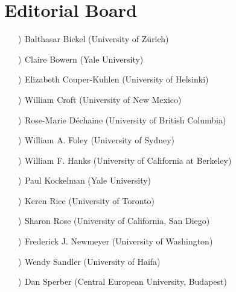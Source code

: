 \documentclass[
notumble,
nofoldmark,
]{leaflet}
\begin{document}
{    \section{Editorial Board}    
    \begin{itemize}
    \item[$\rangle$] Balthasar Bickel (University of Z\"urich)
    \item[$\rangle$] Claire Bowern (Yale University)
    \item[$\rangle$] Elizabeth Couper-Kuhlen (University of Helsinki)
    \item[$\rangle$] William Croft (University of New Mexico)
    \item[$\rangle$] Rose-Marie D\'echaine (University of British Columbia)
    \item[$\rangle$] William A. Foley (University of Sydney)
    \item[$\rangle$] William F. Hanks (University of California at Berkeley)
    \item[$\rangle$] Paul Kockelman (Yale University)
    \item[$\rangle$] Keren Rice (University of Toronto)
    \item[$\rangle$] Sharon Rose (University of California, San Diego)
    \item[$\rangle$] Frederick J. Newmeyer (University of Washington)
    \item[$\rangle$] Wendy Sandler (University of Haifa)
    \item[$\rangle$] Dan Sperber (Central European University, Budapest)
    \end{itemize}}
\end{document}
